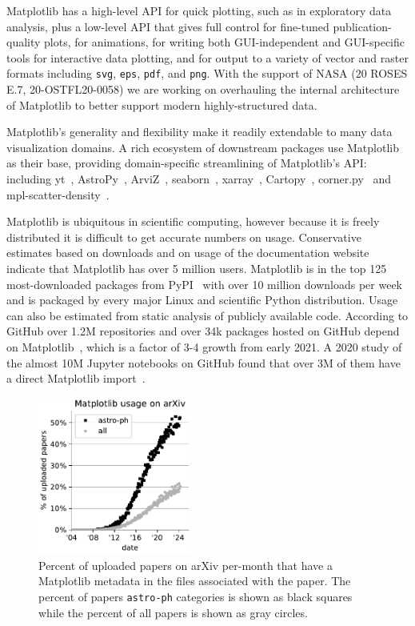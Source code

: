 \documentclass[12pt]{article}
\numberwithin{page}{section}
\begin{document}
Matplotlib has a high-level API for quick plotting, such as in exploratory data
analysis, plus a low-level API that gives full control for fine-tuned
publication-quality plots, for animations, for writing both GUI-independent and
GUI-specific tools for interactive data plotting, and for output to a variety
of vector and raster formats including \texttt{svg}, \texttt{eps},
\texttt{pdf}, and \texttt{png}.  With the support of NASA (20 ROSES E.7, 20-OSTFL20-0058)
we are working on overhauling the internal architecture of Matplotlib to better
support modern highly-structured data.

Matplotlib's generality and flexibility make it readily extendable to
many data visualization domains.  A rich ecosystem of downstream packages use
Matplotlib as their base, providing domain-specific streamlining of
Matplotlib's API: including
yt~\cite{2011ApJS..192....9T}, AstroPy~\cite{astropy:2013,
  astropy:2018}, ArviZ~\cite{arviz_2019},
seaborn~\cite{waskom2020seaborn}, xarray~\cite{hoyer2017xarray},
Cartopy~\cite{Cartopy}, corner.py~\cite{corner} and
mpl-scatter-density~\cite{mpl-scatter-density}.

Matplotlib is ubiquitous in scientific computing, however because it is freely
distributed it is difficult to get accurate numbers on usage.  Conservative
estimates based on downloads and on usage of the documentation website indicate
that Matplotlib has over 5 million users.  Matplotlib is in the top 125
most-downloaded packages from PyPI~\cite{pypi_stats} with over 10 million
downloads per week and is packaged by every major Linux and scientific Python
distribution.  Usage can also be estimated from static analysis of publicly
available code.  According to GitHub over 1.2M repositories and over 34k
packages hosted on GitHub depend on Matplotlib~\cite{gh_deps:2024},  which is a
factor of 3-4 growth from early 2021. A 2020 study of the almost 10M Jupyter
notebooks on GitHub found that over 3M of them have a direct Matplotlib
import~\cite{datalore:2020}.


\begin{figure}
  \includegraphics[width=0.45\textwidth]{arXiv_usage}
  \caption{\small Percent of uploaded papers on arXiv per-month that have a Matplotlib
    metadata in the files associated with the paper.  The percent of papers
    \texttt{astro-ph} categories is shown as black squares while
    the percent of all papers is shown as gray circles.}
  \label{fig:arxiv}
\end{figure}
\end{document}
